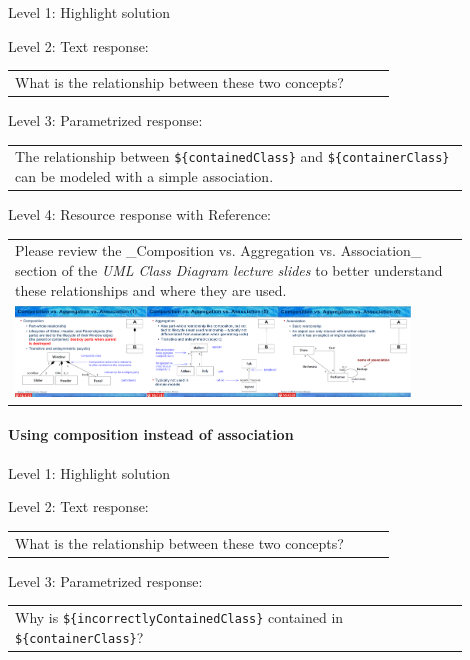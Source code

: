 \noindent Level 1: Highlight solution \medskip

\noindent Level 2: Text response: \medskip

\begin{tabular}{|p{0.9\linewidth}}
What is the relationship between these two concepts?
\end{tabular} \medskip

\noindent Level 3: Parametrized response: \medskip

\begin{tabular}{|p{0.9\linewidth}}
The relationship between \verb|${containedClass}| and \verb|${containerClass}| can be modeled with a simple association.
\end{tabular} \medskip

\noindent Level 4: Resource response with Reference: \medskip

\begin{tabular}{|p{0.9\linewidth}}
Please review the _Composition vs. Aggregation vs. Association_ section of 
the \textit{UML Class Diagram lecture slides} to 
better understand these relationships and where they are used.

\\
\includegraphics[width=0.9\textwidth]{images/composition_aggregation_association.png}
\end{tabular} \medskip


\paragraph{Using composition instead of association}

\noindent Level 1: Highlight solution \medskip

\noindent Level 2: Text response: \medskip

\begin{tabular}{|p{0.9\linewidth}}
What is the relationship between these two concepts?
\end{tabular} \medskip

\noindent Level 3: Parametrized response: \medskip

\begin{tabular}{|p{0.9\linewidth}}
Why is \verb|${incorrectlyContainedClass}| contained in \verb|${containerClass}|?
\end{tabular} \medskip

